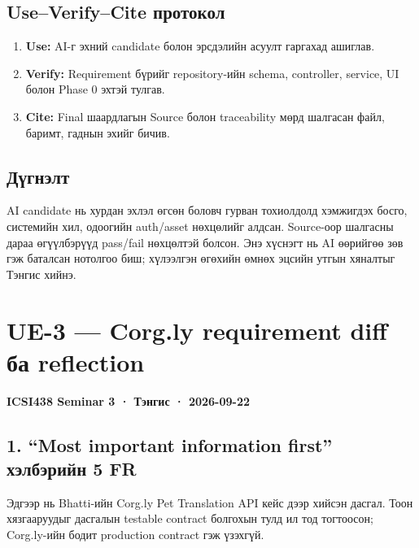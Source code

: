 \documentclass[
  mongolian,
]{article}
\providecommand{\tightlist}{%
  \setlength{\itemsep}{0pt}\setlength{\parskip}{0pt}}
\begin{document}
\endgroup

\subsection{Use--Verify--Cite
протокол}\label{useverifycite-ux43fux440ux43eux442ux43eux43aux43eux43b}

\begin{enumerate}
\def\labelenumi{\arabic{enumi}.}
\tightlist
\item
  \textbf{Use:} AI-г эхний candidate болон эрсдэлийн асуулт гаргахад
  ашиглав.
\item
  \textbf{Verify:} Requirement бүрийг repository-ийн schema, controller,
  service, UI болон Phase 0 эхтэй тулгав.
\item
  \textbf{Cite:} Final шаардлагын Source болон traceability мөрд
  шалгасан файл, баримт, гаднын эхийг бичив.
\end{enumerate}

\subsection{Дүгнэлт}\label{ux434ux4afux433ux43dux44dux43bux442}

AI candidate нь хурдан эхлэл өгсөн боловч гурван тохиолдолд хэмжигдэх
босго, системийн хил, одоогийн auth/asset нөхцөлийг алдсан. Source-оор
шалгасны дараа өгүүлбэрүүд pass/fail нөхцөлтэй болсон. Энэ хүснэгт нь AI
өөрийгөө зөв гэж баталсан нотолгоо биш; хүлээлгэн өгөхийн өмнөх эцсийн
утгын хяналтыг Тэнгис хийнэ.

\newpage

\section{UE-3 --- Corg.ly requirement diff ба
reflection}\label{ue-3-corg.ly-requirement-diff-ux431ux430-reflection}

\textbf{ICSI438 Seminar 3 · Тэнгис · 2026-09-22}

\subsection{1. ``Most important information first'' хэлбэрийн 5
FR}\label{most-important-information-first-ux445ux44dux43bux431ux44dux440ux438ux439ux43d-5-fr}

Эдгээр нь Bhatti-ийн Corg.ly Pet Translation API кейс дээр хийсэн
дасгал. Тоон хязгааруудыг дасгалын testable contract болгохын тулд ил
тод тогтоосон; Corg.ly-ийн бодит production contract гэж үзэхгүй.
\end{document}
